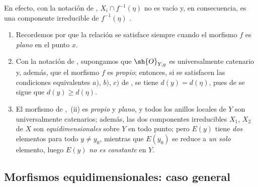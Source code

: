 En efecto, con la notación de , $X_i\cap f^{-1}(\eta)$ no es vacío y, en consecuencia, es una componente irreducible de $f^{-1}(\eta)$ .

\begin{remarks}[13.2.12]
\label{IV.13.2.12}
\begin{enumerate}[label=(\roman*)]
  \item Recordemos por  que la relación  se satisface siempre cuando el morfismo $f$ es \emph{plano} en el punto $x$.
  \item Con la notación de , supongamos que $\sh{O}_{Y,y}$ es universalmente catenario y, además, que el morfismo $f$ es \emph{propio}; entonces, si se satisfacen las condiciones equivalentes $a)$, $b)$, $c)$ de , se tiene $d(y)=d(\eta)$, pues de  se sigue que $d(y)\geq d(\eta)$.
  \item El morfismo de ,~(ii) es \emph{propio} y \emph{plano}, y todos los anillos locales de $Y$ son universalmente catenarios; además, las dos componentes irreducibles $X_1$, $X_2$ de $X$ son \emph{equidimensionales} sobre $Y$ en todo punto; pero $E(y)$ tiene \emph{dos} elementos para todo $y\neq y_0$, mientras que $E(y_0)$ se reduce a \emph{un solo} elemento, luego $E(y)$ \emph{no es constante} en $Y$.
\end{enumerate}
\end{remarks}

\subsection{Morfismos equidimensionales: caso general}
\label{subsection:IV.13.3}

